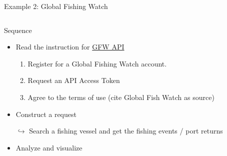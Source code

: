 \documentclass[xcolor=x11names, aspectratio=169, compress]{beamer}
\renewcommand{\(}{\begin{columns}}
\renewcommand{\)}{\end{columns}}
\newcommand{\<}[1]{\begin{column}{#1}}
\renewcommand{\>}{\end{column}}
\begin{document}
\begin{frame}{Example 2: Global Fishing Watch }
\begin{columns}[T]
  \begin{column}{0.6\textwidth}
Sequence
\begin{itemize}[<+->]
    \item Read the instruction for \href{https://globalfishingwatch.org/our-apis/documentation}{GFW API}
    \begin{enumerate}[<+->]
    \item Register for a Global Fishing Watch account.
    \item Request an API Access Token
    \item Agree to the terms of use (cite Global Fish Watch as source)
\end{enumerate}
    \item Construct a request
    \item[$\hookrightarrow$ ] Search a fishing vessel and get the fishing events / port returns
     \item Analyze and visualize
\end{itemize}
     \end{column}
    \begin{column}{0.4\textwidth}
    \begin{center}
      \begin{itemize}

\end{itemize}
\end{center}
\end{column}
\end{columns}
\end{frame}
\end{document}
